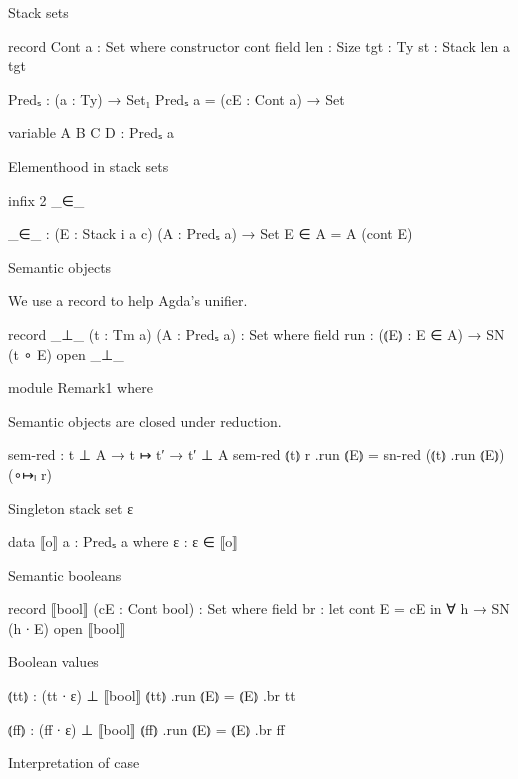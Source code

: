 
Stack sets

\begin{code}
record Cont a : Set where
  constructor cont
  field
    {len}  : Size
    {tgt}  : Ty
    st     : Stack len a tgt

Predₛ : (a : Ty) → Set₁
Predₛ a = (cE : Cont a) → Set

variable A B C D : Predₛ a
\end{code}

Elementhood in stack sets

\begin{code}
infix 2 _∈_

_∈_ : (E : Stack i a c) (A : Predₛ a) → Set
E ∈ A = A (cont E)
\end{code}

Semantic objects

We use a record to help Agda's unifier.

\begin{code}
record _⊥_ (t : Tm a) (A : Predₛ a) : Set where
  field run : (⦅E⦆ : E ∈ A) → SN (t ∘ E)
open _⊥_

module Remark1 where
\end{code}

  Semantic objects are closed under reduction.

\begin{code}
  sem-red : t ⊥ A → t ↦ t′ → t′ ⊥ A
  sem-red ⦅t⦆ r .run ⦅E⦆ = sn-red (⦅t⦆ .run ⦅E⦆) (∘↦ₗ r)
\end{code}

Singleton stack set {ε}

\begin{code}
data ⟦o⟧ {a} : Predₛ a where
  ε : ε ∈ ⟦o⟧
\end{code}

Semantic booleans

\begin{code}
record ⟦bool⟧ (cE : Cont bool) : Set where
  field br : let cont E = cE in ∀ h → SN (h ∙ E)
open ⟦bool⟧
\end{code}

Boolean values

\begin{code}
⦅tt⦆ : (tt ∙ ε) ⊥ ⟦bool⟧
⦅tt⦆ .run ⦅E⦆ = ⦅E⦆ .br tt

⦅ff⦆ : (ff ∙ ε) ⊥ ⟦bool⟧
⦅ff⦆ .run ⦅E⦆ = ⦅E⦆ .br ff
\end{code}

Interpretation of case

